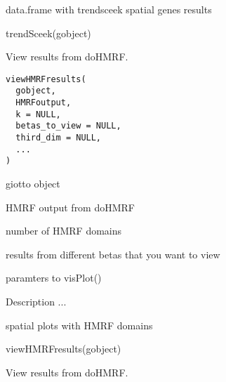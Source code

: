 \documentclass[a4paper]{book}
\begin{document}
%
\begin{Value}
data.frame with trendsceek spatial genes results
\end{Value}
%
\begin{Examples}
\begin{ExampleCode}
    trendSceek(gobject)
\end{ExampleCode}
\end{Examples}
%
\begin{Description}\relax
View results from doHMRF.
\end{Description}
%
\begin{Usage}
\begin{verbatim}
viewHMRFresults(
  gobject,
  HMRFoutput,
  k = NULL,
  betas_to_view = NULL,
  third_dim = NULL,
  ...
)
\end{verbatim}
\end{Usage}
%
\begin{Arguments}
\begin{ldescription}
\item[\code{gobject}] giotto object

\item[\code{HMRFoutput}] HMRF output from doHMRF

\item[\code{k}] number of HMRF domains

\item[\code{betas\_to\_view}] results from different betas that you want to view

\item[\code{...}] paramters to visPlot()
\end{ldescription}
\end{Arguments}
%
\begin{Details}\relax
Description ...
\end{Details}
%
\begin{Value}
spatial plots with HMRF domains
\end{Value}
%
\begin{SeeAlso}\relax
{}
\end{SeeAlso}
%
\begin{Examples}
\begin{ExampleCode}
    viewHMRFresults(gobject)
\end{ExampleCode}
\end{Examples}
%
\begin{Description}\relax
View results from doHMRF.
\end{Description}
\end{document}
